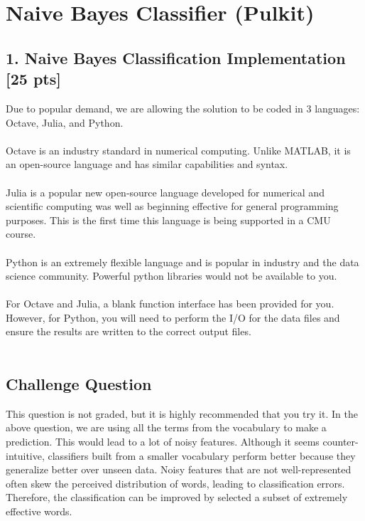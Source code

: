 \documentclass{article}
\newcounter{homeworkProblemCounter} %
\newcommand{\homeworkProblemName}{}
\newenvironment{homeworkProblem}[1][Problem \arabic{homeworkProblemCounter}]{ %
\stepcounter{homeworkProblemCounter} %
\renewcommand{\homeworkProblemName}{#1} %
\section{\homeworkProblemName} %
}{
}
\newcommand{\homeworkSectionName}{}
\newenvironment{homeworkSection}[1]{ %
\renewcommand{\homeworkSectionName}{#1} %
\subsection{\homeworkSectionName} %
}{
}
\begin{document}
\begin{homeworkProblem}[Naive Bayes Classifier (Pulkit)]
\begin{homeworkSection}{1. Naive Bayes Classification Implementation [25 pts]}
Due to popular demand, we are allowing the solution to be coded in 3 languages: Octave, Julia, and Python. \\ \\
Octave is an industry standard in numerical computing. Unlike MATLAB, it is an open-source language and has similar capabilities and syntax.\\ \\
Julia is a popular new open-source language developed for numerical and scientific computing was well as beginning effective for general programming purposes. This is the first time this language is being supported in a CMU course. \\ \\
Python is an extremely flexible language and is popular in industry and the data science community. Powerful python libraries would not be available to you. \\ \\

For Octave and Julia, a blank function interface has been provided for you. However, for Python, you will need to perform the I/O for the data files  and ensure the results are written to the correct output files. \\ \\
\end{homeworkSection}


\begin{homeworkSection}{Challenge Question}
This question is not graded, but it is highly recommended that you try it.
In the above question, we are using all the terms from the vocabulary to make a prediction. This would lead to a lot of noisy features. Although it seems counter-intuitive, classifiers built from a smaller vocabulary perform better because they generalize better over unseen data. Noisy features that are not well-represented often skew the perceived distribution of words, leading to classification errors. Therefore, the classification can be improved by selected a subset of extremely effective words. 
\end{homeworkSection}

\end{homeworkProblem}
\newpage

\end{document}
